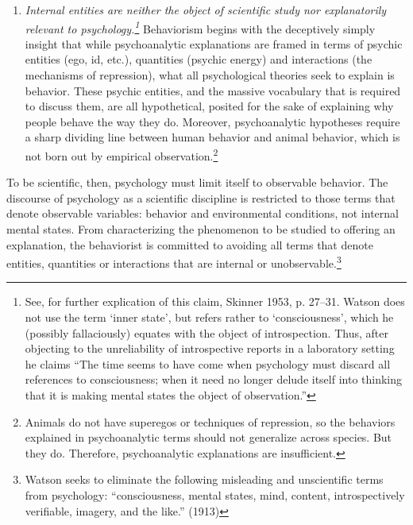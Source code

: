 \begin{enumerate}
\item \emph{Internal entities are neither the object of scientific study nor explanatorily relevant to psychology.\footnote{See, for further explication of this claim, Skinner 1953, p. 27--31. Watson does not use the term `inner state', but refers rather to `consciousness', which he (possibly fallaciously) equates with the object of introspection. Thus, after objecting to the unreliability of introspective reports in a laboratory setting he claims ``The time seems to have come when psychology must discard all references to consciousness; when it need no longer delude itself into thinking that it is making mental states the object of observation.''}} Behaviorism begins with the deceptively simply insight that while psychoanalytic explanations are framed in terms of psychic entities (ego, id, etc.), quantities (psychic energy) and interactions (the mechanisms of repression), what all psychological theories seek to explain is behavior. These psychic entities, and the massive vocabulary that is required to discuss them, are all hypothetical, posited for the sake of explaining why people behave the way they do. Moreover, psychoanalytic hypotheses require a sharp dividing line between human behavior and animal behavior, which is not born out by empirical observation.\footnote{Animals do not have superegos or techniques of repression, so the behaviors explained in psychoanalytic terms should not generalize across species. But they do. Therefore, psychoanalytic explanations are insufficient.}

\end{enumerate}

To be scientific, then, psychology must limit itself to observable behavior. The discourse of psychology as a scientific discipline is restricted to those terms that denote observable variables: behavior and environmental conditions, not internal mental states. From characterizing the phenomenon to be studied to offering an explanation, the behaviorist is committed to avoiding all terms that denote entities, quantities or interactions that are internal or unobservable.\footnote{Watson seeks to eliminate the following misleading and unscientific terms from psychology: ``consciousness, mental states, mind, content, introspectively verifiable, imagery, and the like.'' (1913)}

